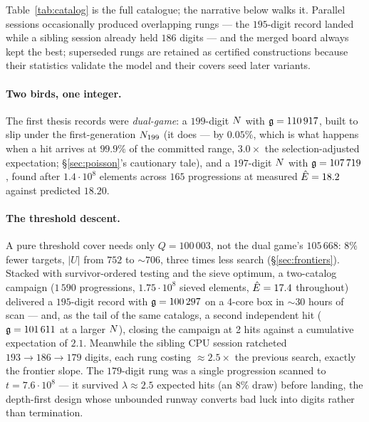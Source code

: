 Table~\ref{tab:catalog} is the full catalogue; the narrative below walks
it. Parallel sessions occasionally produced overlapping rungs --- the
$195$-digit record landed while a sibling session already held $186$
digits --- and the merged board always kept the best; superseded rungs
are retained as certified constructions because their statistics
validate the model and their covers seed later variants.

\paragraph{Two birds, one integer.} The first thesis records were
\emph{dual-game}: a $199$-digit $N$ with $\mathfrak{g}=110\,917$, built to slip
under the first-generation $N_{199}$ (it does --- by $0.05\%$, which is
what happens when a hit arrives at $99.9\%$ of the committed range,
$3.0\times$ the selection-adjusted expectation; \S\ref{sec:poisson}'s
cautionary tale), and a $197$-digit $N$ with $\mathfrak{g}=107\,719$, found
after $1.4\cdot10^8$ elements across $165$ progressions at measured
$\hat{E}=18.2$ against predicted $18.20$.

\paragraph{The threshold descent.} A pure threshold cover needs only
$Q=100\,003$, not the dual game's $105\,668$: $8\%$ fewer targets,
$|U|$ from $752$ to $\sim706$, three times less search
(\S\ref{sec:frontiers}). Stacked with survivor-ordered testing and the
sieve optimum, a two-catalog campaign ($1\,590$ progressions,
$1.75\cdot10^8$ sieved elements, $\hat{E}=17.4$ throughout) delivered a
$195$-digit record with $\mathfrak{g}=100\,297$ on a 4-core box in $\sim$30 hours
of scan --- and, as the tail of the same catalogs, a second independent
hit ($\mathfrak{g}=101\,611$ at a larger $N$), closing the campaign at 2 hits
against a cumulative expectation of $2.1$. Meanwhile the sibling
CPU session ratcheted $193\to186\to179$ digits, each rung costing
$\approx2.5\times$ the previous search, exactly the frontier slope. The
$179$-digit rung was a single progression scanned to
$t=7.6\cdot10^8$ --- it survived $\lambda\approx2.5$ expected hits (an
$8\%$ draw) before landing, the depth-first design whose unbounded
runway converts bad luck into digits rather than termination.


